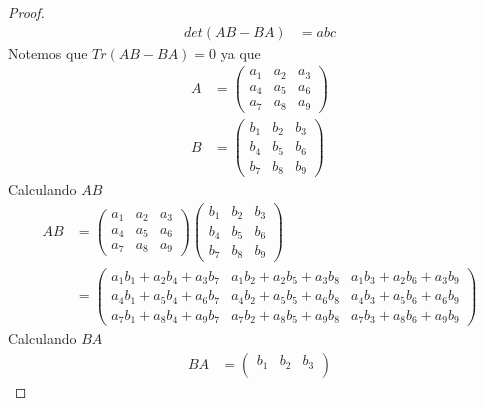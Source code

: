 \documentclass[a4paper]{article}
\begin{document}
\begin{proof}
\begin{align*}
        det(AB - BA) &= abc
    \end{align*}
    Notemos que \(Tr\left(AB - BA\right) = 0\) ya que
    \begin{align*}
        A &= 
        \begin{pmatrix}
            a_{1} & a_{2} & a_{3}\\
            a_{4} & a_{5} & a_{6}\\
            a_{7} & a_{8} & a_{9}
        \end{pmatrix} \\
        B &= 
        \begin{pmatrix}
            b_{1} & b_{2} & b_{3}\\
            b_{4} & b_{5} & b_{6}\\
            b_{7} & b_{8} & b_{9}
        \end{pmatrix}
    \end{align*}
    Calculando \(AB\)
    \begin{align*}
        AB &=     
        \begin{pmatrix}
            a_{1} & a_{2} & a_{3}\\
            a_{4} & a_{5} & a_{6}\\
            a_{7} & a_{8} & a_{9}
        \end{pmatrix}
        \begin{pmatrix}
            b_{1} & b_{2} & b_{3}\\
            b_{4} & b_{5} & b_{6}\\
            b_{7} & b_{8} & b_{9}
        \end{pmatrix} \\
        &=
        \begin{pmatrix}
            a_{1} b_{1} + a_{2} b_{4} + a_{3} b_{7} & a_{1} b_{2} + a_{2} b_{5} + a_{3} b_{8} & a_{1} b_{3} + a_{2} b_{6} + a_{3} b_{9} \\
            a_{4} b_{1} + a_{5} b_{4} + a_{6} b_{7} & a_{4} b_{2} + a_{5} b_{5} + a_{6} b_{8} & a_{4} b_{3} + a_{5} b_{6} + a_{6} b_{9}\\
            a_{7} b_{1} + a_{8} b_{4} + a_{9} b_{7} & a_{7} b_{2} + a_{8} b_{5} + a_{9} b_{8} & a_{7} b_{3} + a_{8} b_{6} + a_{9} b_{9}
        \end{pmatrix}
    \end{align*}
    Calculando \(BA\)
    \begin{align*}
        BA &=
        \begin{pmatrix}
            b_{1} & b_{2} & b_{3}\\

\end{pmatrix}
\end{align*}
\end{proof}
\end{document}
